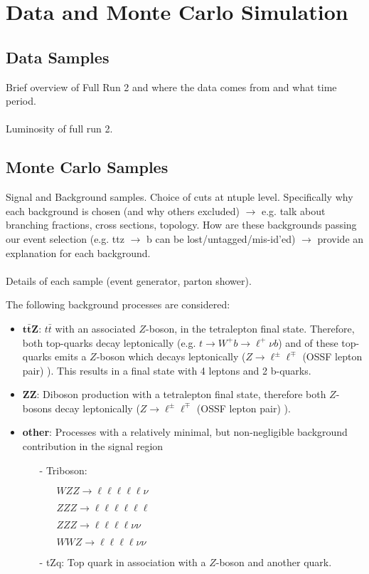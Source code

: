 
\section{Data and Monte Carlo Simulation}
\subsection{Data Samples}
Brief overview of Full Run 2 and where the data comes from and what time period.\\\\
Luminosity of full run 2. 

\subsection{Monte Carlo Samples}
Signal and Background samples. Choice of cuts at ntuple level. Specifically why each background is chosen (and why others excluded) $\rightarrow$ e.g. talk about branching fractions, cross sections, topology. How are these backgrounds passing our event selection (e.g. ttz $\rightarrow$ b can be lost/untagged/mis-id'ed) $\rightarrow$ provide an explanation for each background.\\\\
Details of each sample (event generator, parton shower).


The following background processes are considered:
\begin{itemize}
	\item $\mathbf{t \bar{t} Z}$: $t \bar{t} $  with an associated $Z$-boson, in the tetralepton final state. Therefore, both top-quarks decay leptonically (e.g. $t \rightarrow W^+ b \rightarrow \ell^+ \nu b$) and of these top-quarks emits a $Z$-boson which decays leptonically ($Z \rightarrow \ell^\pm \ell^\mp$ (OSSF lepton pair) ). This results in a final state with 4 leptons and 2 b-quarks.
	\item $\mathbf{ZZ}$: Diboson production with a tetralepton final state, therefore both $Z$-bosons decay leptonically ($Z \rightarrow \ell^\pm \ell^\mp$ (OSSF lepton pair) ).
	\item \textbf{other}: Processes with a relatively minimal, but non-negligible background contribution in the \tWZ signal region 
	\begin{itemize}
	\item [-] Triboson: 
	\begin{itemize}
		\item [] $WZZ \rightarrow \ell\ell\ell\ell\ell \nu$
		\item [] $ZZZ \rightarrow \ell \ell \ell\ell\ell\ell$
		\item [] $ZZZ \rightarrow \ell\ell\ell\ell\nu\nu$
		\item [] $WWZ \rightarrow \ell\ell\ell\ell\nu\nu$
	\end{itemize}
	\item [-] tZq: Top quark in association with a $Z$-boson and another quark.
	 
	\end{itemize}
\end{itemize}




